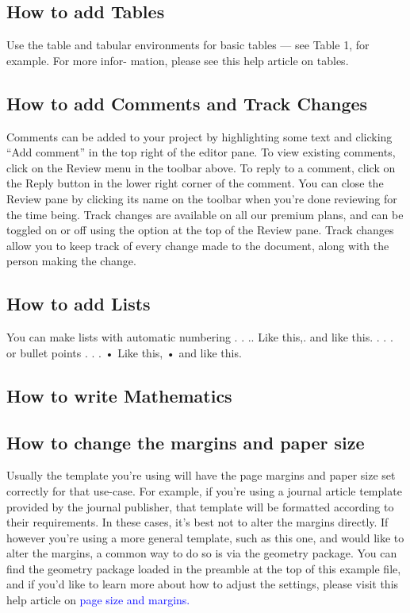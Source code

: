 \documentclass{article}
\begin{document}
\subsection{How to add Tables}
Use the table and tabular environments for basic tables — see Table 1, for example. For more infor-
mation, please see this help article on tables.
\subsection{How to add Comments and Track Changes}
Comments can be added to your project by highlighting some text and clicking “Add comment” in
the top right of the editor pane. To view existing comments, click on the Review menu in the toolbar
above. To reply to a comment, click on the Reply button in the lower right corner of the comment.
You can close the Review pane by clicking its name on the toolbar when you’re done reviewing for the
time being.
Track changes are available on all our premium plans, and can be toggled on or off using the option
at the top of the Review pane. Track changes allow you to keep track of every change made to the
document, along with the person making the change.
\subsection{How to add Lists}
You can make lists with automatic numbering . . .\newline{}. Like this,\newline{}. and like this.\newline\newline
. . . or bullet points . . .\newline\newline
• Like this,\newline\newline
• and like this.
\subsection{How to write Mathematics}
\subsection{How to change the margins and paper size}
Usually the template you’re using will have the page margins and paper size set correctly for that
use-case. For example, if you’re using a journal article template provided by the journal publisher,
that template will be formatted according to their requirements. In these cases, it’s best not to alter
the margins directly.
If however you’re using a more general template, such as this one, and would like to alter the
margins, a common way to do so is via the geometry package. You can find the geometry package
loaded in the preamble at the top of this example file, and if you’d like to learn more about how to
adjust the settings, please visit this help article on \textcolor{blue}{page size and margins.}
\end{document}
